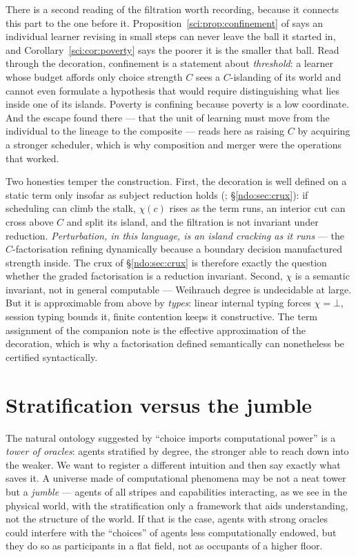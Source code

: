 \noindent
There is a second reading of the filtration worth recording, because it connects this
part to the one before it. Proposition~\ref{sci:prop:confinement} of \chSci says an
individual learner revising in small steps can never leave the ball it started in, and
Corollary~\ref{sci:cor:poverty} says the poorer it is the smaller that ball. Read
through the decoration, confinement is a statement about \emph{threshold}: a learner
whose budget affords only choice strength $C$ sees a $C$-islanding of its world and
cannot even formulate a hypothesis that would require distinguishing what lies inside
one of its islands. Poverty is confining because poverty is a low coordinate. And the
escape found there --- that the unit of learning must move from the individual to the
lineage to the composite --- reads here as raising $C$ by acquiring a stronger
scheduler, which is why composition and merger were the operations that worked.

Two honesties temper the construction. First, the decoration is well defined on a static term only
insofar as subject reduction holds (\cite{choicesched}; \S\ref{ndo:sec:crux}): if scheduling can climb
the stalk, $\chi(c)$ rises as the term runs, an interior cut can cross above $C$ and split its
island, and the filtration is not invariant under reduction. \emph{Perturbation, in this language,
is an island cracking as it runs} --- the $C$-factorisation refining dynamically because a boundary
decision manufactured strength inside. The crux of \S\ref{ndo:sec:crux} is therefore exactly the
question whether the graded factorisation is a reduction invariant. Second, $\chi$ is a semantic
invariant, not in general computable --- Weihrauch degree is undecidable at large. But it is
approximable from above by \emph{types}: linear internal typing forces $\chi = \bot$, session typing
bounds it, finite contention keeps it constructive. The term assignment of the companion note is the
effective approximation of the decoration, which is why a factorisation defined semantically can
nonetheless be certified syntactically.


\section{Stratification versus the jumble}\label{ndo:sec:jumble}

The natural ontology suggested by ``choice imports computational power'' is a
\emph{tower of oracles}: agents stratified by degree, the stronger able to reach
down into the weaker. We want to register a different intuition and then say
exactly what saves it. A universe made of computational phenomena may be not a
neat tower but a \emph{jumble} --- agents of all stripes and capabilities
interacting, as we see in the physical world, with the stratification only a
framework that aids understanding, not the structure of the world. If that is the
case, agents with strong oracles could interfere with the ``choices'' of agents
less computationally endowed, but they do so as participants in a flat field, not
as occupants of a higher floor.


